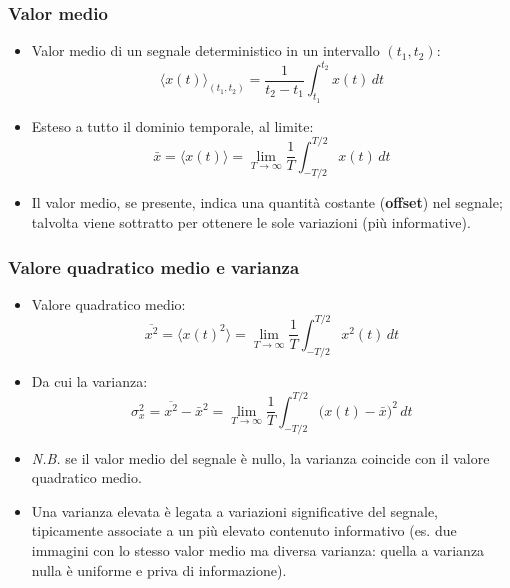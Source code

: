 \documentclass[12pt, a4paper]{article}
\begin{document}
\subsubsection{Valor medio}
\begin{itemize}
    \item Valor medio di un segnale deterministico in un intervallo $(t_1,t_2)$:
    $$\langle x(t)\rangle_{(t_1,t_2)} = \frac{1}{t_2-t_1}\int_{t_1}^{t_2} x(t)\,dt$$
    \item Esteso a tutto il dominio temporale, al limite:
    $$\bar x = \langle x(t)\rangle = \lim_{T\to\infty} \frac1T \int_{-T/2}^{T/2} x(t)\,dt$$
    \item Il valor medio, se presente, indica una quantità costante (\textbf{offset}) nel segnale; talvolta viene sottratto per ottenere le sole variazioni (più informative).
\end{itemize}

\subsubsection{Valore quadratico medio e varianza}
\begin{itemize}
    \item Valore quadratico medio:
    $$\overline{x^2} = \langle x(t)^2\rangle = \lim_{T\to\infty} \frac1T \int_{-T/2}^{T/2} x^2(t)\,dt$$
    \item Da cui la varianza:
    $$\sigma_x^2 = \overline{x^2} - \bar x^2 = \lim_{T\to\infty} \frac1T \int_{-T/2}^{T/2} \big(x(t)-\bar x\big)^2\,dt$$
    \item \textit{N.B.} se il valor medio del segnale è nullo, la varianza coincide con il valore quadratico medio.
    \item Una varianza elevata è legata a variazioni significative del segnale, tipicamente associate a un più elevato contenuto informativo (es. due immagini con lo stesso valor medio ma diversa varianza: quella a varianza nulla è uniforme e priva di informazione).
\end{itemize}
\end{document}
